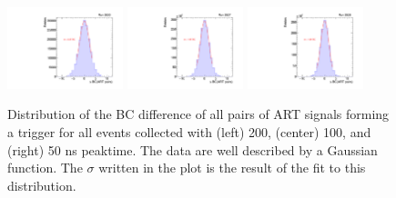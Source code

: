 \begin{figure}[!htpb]
  \begin{center}
    \includegraphics[width=0.3\textwidth]{figures/gbtanalysis3530/artrpairs_lin.pdf}
    \includegraphics[width=0.3\textwidth]{figures/gbtanalysis3527/artrpairs_lin.pdf}
    \includegraphics[width=0.3\textwidth]{figures/gbtanalysis3528/artrpairs_lin.pdf}
  \end{center}
  \vspace{-10pt}
  \caption{ Distribution of the BC difference of all pairs of ART signals
 forming a trigger  for all events collected with (left) 200, (center) 100, and  (right) 50 ns peaktime.
 The data are  well described by a Gaussian function. The $\sigma$ written in the plot is the result of the fit to this
 distribution.}
  \label{fig:integ_pairs}
\end{figure}
